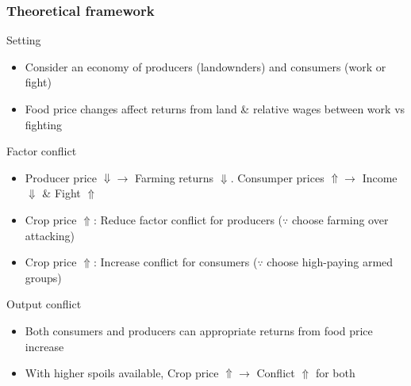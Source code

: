 \documentclass[aspectratio=169]{beamer}
\begin{document}
\begin{frame}
\frametitle{Theoretical framework}
Setting
\begin{itemize}\setlength\itemsep{3pt}
\item Consider an economy of producers (landownders) and consumers (work or fight)
\item Food price changes affect returns from land \& relative wages between work vs fighting
\end{itemize}\medskip
Factor conflict
\begin{itemize}\setlength\itemsep{3pt}
\item Producer price $\Downarrow\to$ Farming returns $\Downarrow$. Consumper prices $\Uparrow\to$ Income $\Downarrow$ \& Fight $\Uparrow$
\item Crop price $\Uparrow$: Reduce factor conflict for producers ($\because$ choose farming over attacking)
\item  Crop price $\Uparrow$: Increase conflict for consumers ($\because$ choose high-paying armed groups)
\end{itemize}\medskip
Output conflict
\begin{itemize}\setlength\itemsep{3pt}
\item Both consumers and producers can appropriate returns from food price increase
\item With higher spoils available,  Crop price $\Uparrow\to$ Conflict $\Uparrow$ for both
\end{itemize}\medskip
\end{frame}
\end{document}
